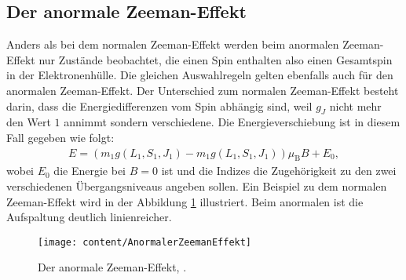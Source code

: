 \subsection{Der anormale Zeeman-Effekt}
Anders als bei dem normalen Zeeman-Effekt werden beim anormalen Zeeman-Effekt nur Zustände beobachtet, die einen Spin enthalten also einen Gesamtspin in der Elektronenhülle. Die gleichen Auswahlregeln gelten ebenfalls auch für den anormalen Zeeman-Effekt. Der Unterschied zum normalen Zeeman-Effekt besteht darin, dass die Energiedifferenzen vom Spin abhängig sind, weil $g_J$ nicht mehr den Wert $1$ annimmt sondern verschiedene. Die Energieverschiebung ist in diesem Fall gegeben wie folgt:
\begin{align}
E=(m_1g(L_1,S_1,J_1)-m_1g(L_1,S_1,J_1))\mu_\text{B}B+E_0, \label{eqn:Eanomal}
\end{align}
wobei $E_0$ die Energie bei $B=0$ ist und die Indizes die Zugehörigkeit zu den zwei verschiedenen Übergangsniveaus angeben sollen. Ein Beispiel zu dem normalen Zeeman-Effekt wird in der Abbildung \ref{fig:anormalerzeemaneffekt} illustriert. Beim anormalen ist die Aufspaltung deutlich linienreicher.
\begin{figure}[h!]
	\centering
	\texttt{[image: content/AnormalerZeemanEffekt]}
	\caption{Der anormale Zeeman-Effekt, \cite[11]{anleitungV27}.}
	\label{fig:anormalerzeemaneffekt}
\end{figure}
